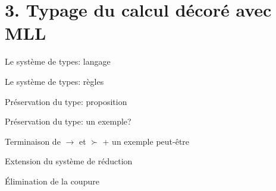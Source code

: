 \documentclass[11pt]{beamer}
\begin{document}

\section{3. Typage du calcul décoré avec MLL}

\begin{frame}
Le système de types: langage %
\end{frame}

\begin{frame}
Le système de types: règles %
\end{frame}

\begin{frame}
Préservation du type: proposition %
\end{frame}

\begin{frame}
Préservation du type: un exemple? %
\end{frame}

\begin{frame}
Terminaison de $\to$ et $\succ$ + un exemple peut-être %
\end{frame}

\begin{frame}
Extension du système de réduction %
\end{frame}

\begin{frame}
Élimination de la coupure %
\end{frame}
\end{document}
